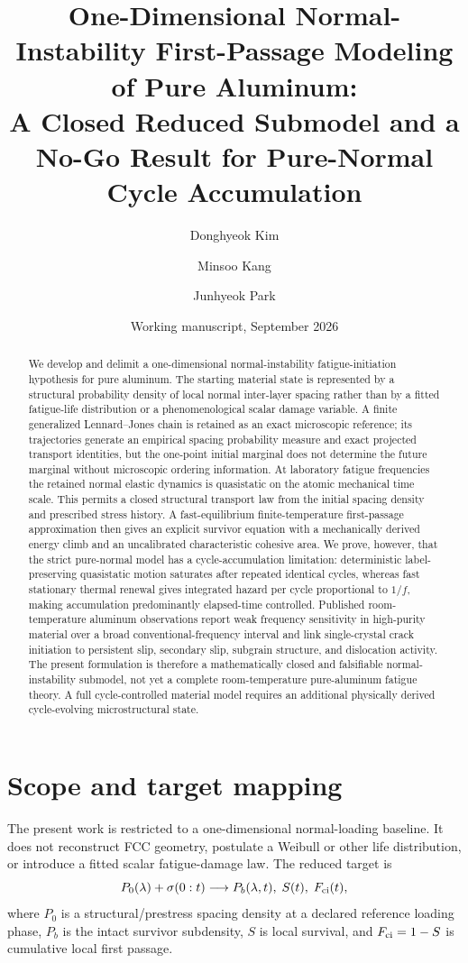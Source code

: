 \documentclass[11pt]{article}
\title{One-Dimensional Normal-Instability First-Passage Modeling of Pure Aluminum:\\A Closed Reduced Submodel and a No-Go Result for Pure-Normal Cycle Accumulation}
\author{Donghyeok Kim \and Minsoo Kang \and Junhyeok Park}
\date{Working manuscript, September 2026}
\begin{document}
\maketitle

\begin{abstract}
We develop and delimit a one-dimensional normal-instability fatigue-initiation hypothesis for pure aluminum. The starting material state is represented by a structural probability density of local normal inter-layer spacing rather than by a fitted fatigue-life distribution or a phenomenological scalar damage variable. A finite generalized Lennard--Jones chain is retained as an exact microscopic reference; its trajectories generate an empirical spacing probability measure and exact projected transport identities, but the one-point initial marginal does not determine the future marginal without microscopic ordering information. At laboratory fatigue frequencies the retained normal elastic dynamics is quasistatic on the atomic mechanical time scale. This permits a closed structural transport law from the initial spacing density and prescribed stress history. A fast-equilibrium finite-temperature first-passage approximation then gives an explicit survivor equation with a mechanically derived energy climb and an uncalibrated characteristic cohesive area. We prove, however, that the strict pure-normal model has a cycle-accumulation limitation: deterministic label-preserving quasistatic motion saturates after repeated identical cycles, whereas fast stationary thermal renewal gives integrated hazard per cycle proportional to $1/f$, making accumulation predominantly elapsed-time controlled. Published room-temperature aluminum observations report weak frequency sensitivity in high-purity material over a broad conventional-frequency interval and link single-crystal crack initiation to persistent slip, secondary slip, subgrain structure, and dislocation activity. The present formulation is therefore a mathematically closed and falsifiable normal-instability submodel, not yet a complete room-temperature pure-aluminum fatigue theory. A full cycle-controlled material model requires an additional physically derived cycle-evolving microstructural state.
\end{abstract}

\section{Scope and target mapping}
The present work is restricted to a one-dimensional normal-loading baseline. It does not reconstruct FCC geometry, postulate a Weibull or other life distribution, or introduce a fitted scalar fatigue-damage law. The reduced target is
\begin{equation}
P_0(\lambda)+\sigma(0:t)
\longrightarrow
P_b(\lambda,t),\;S(t),\;F_{\rm ci}(t),
\label{eq:target}
\end{equation}
where $P_0$ is a structural/prestress spacing density at a declared reference loading phase, $P_b$ is the intact survivor subdensity, $S$ is local survival, and $F_{\rm ci}=1-S$ is cumulative local first passage.
\end{document}
